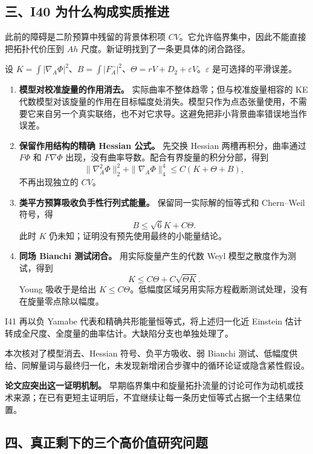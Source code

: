 \documentclass[
  10pt,
]{article}
\begin{document}
\hypertarget{ux4e09i40-ux4e3aux4ec0ux4e48ux6784ux6210ux5b9eux8d28ux63a8ux8fdb}{%
\subsection{三、I40
为什么构成实质推进}\label{ux4e09i40-ux4e3aux4ec0ux4e48ux6784ux6210ux5b9eux8d28ux63a8ux8fdb}}

此前的障碍是二阶预算中残留的背景体积项
\(CV\)。它允许临界集中，因此不能直接把拓扑代价压到 \(Ah\)
尺度。新证明找到了一条更具体的闭合路径。

设
\(K=\int|\nabla_A\Phi|^2\)、\(B=\int|F_A^-|^2\)、\(\Theta=rV+D_2+\varepsilon V\)。\(\varepsilon\)
是可选择的平滑误差。

\begin{enumerate}
\def\labelenumi{\arabic{enumi}.}
\item
  \textbf{模型对校准旋量的作用消去。}
  实际曲率不整体趋零；但与校准旋量相容的 KE
  代数模型对该旋量的作用在目标幅度处消失。模型只作为点态张量使用，不需要它来自另一个真实联络，也不对它求导。这避免把非小背景曲率错误地当作误差。
\item
  \textbf{保留作用结构的精确 Hessian 公式。} 先交换 Hessian
  两槽再积分，曲率通过 \(F\Phi\) 和 \(F\nabla\Phi\)
  出现，没有曲率导数。配合有界旋量的积分分部，得到 \[
  \|\nabla_A^2\Phi\|_2^2+\|\nabla_A\Phi\|_4^4
  \le C(K+\Theta+B),
  \] 不再出现独立的 \(CV\)。
\item
  \textbf{类平方预算吸收负手性行列式能量。} 保留同一实际解的恒等式和
  Chern--Weil 符号，得 \[
  B\le\sqrt6K+C\Theta.
  \] 此时 \(K\) 仍未知；证明没有预先使用最终的小能量结论。
\item
  \textbf{同场 Bianchi 测试闭合。} 用实际旋量产生的代数 Weyl
  模型之散度作为测试，得到 \[
  K\le C\Theta+C\sqrt{\Theta K}.
  \] Young 吸收于是给出
  \(K\le C\Theta\)。低幅度区域另用实际方程截断测试处理，没有在旋量零点除以幅度。
\end{enumerate}

I41 再以负 Yamabe 代表和精确共形能量恒等式，将上述归一化近 Einstein
估计转成全尺度、全度量的曲率估计。大缺陷分支也单独处理了。

本次核对了模型消去、Hessian 符号、负平方吸收、弱 Bianchi
测试、低幅度供给、同解量词与最终归一化，未发现新增闭合步骤中的循环论证或隐含紧性假设。

\textbf{论文应突出这一证明机制。}
早期临界集中和旋量拓扑流量的讨论可作为动机或技术来源；在已有更短主证明后，不宜继续让每一条历史恒等式占据一个主结果位置。

\hypertarget{ux56dbux771fux6b63ux5269ux4e0bux7684ux4e09ux4e2aux9ad8ux4ef7ux503cux7814ux7a76ux95eeux9898}{%
\subsection{四、真正剩下的三个高价值研究问题}\label{ux56dbux771fux6b63ux5269ux4e0bux7684ux4e09ux4e2aux9ad8ux4ef7ux503cux7814ux7a76ux95eeux9898}}
\end{document}
